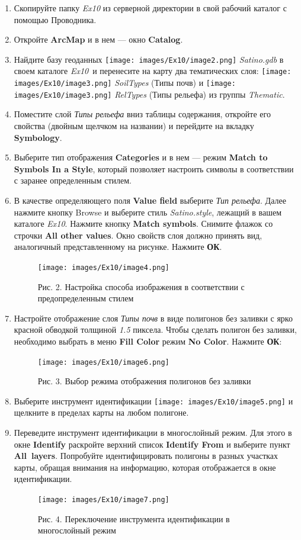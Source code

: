 \documentclass[12pt,]{book}
\begin{document}
\begin{enumerate}
\def\labelenumi{\arabic{enumi}.}
\item
  Скопируйте папку \emph{Ex10} из серверной директории в свой рабочий каталог с помощью Проводника.
\item
  Откройте \textbf{ArcMap} и в нем --- окно \textbf{Catalog}.
\item
  Найдите базу геоданных \texttt{[image: images/Ex10/image2.png]} \emph{Satino.gdb} в своем каталоге \emph{Ex10}~и перенесите на карту два тематических слоя: \texttt{[image: images/Ex10/image3.png]} \emph{SoilTypes} (Типы почв) и \texttt{[image: images/Ex10/image3.png]} \emph{RelTypes} (Типы рельефа) из группы \emph{Thematic}.
\item
  Поместите слой \emph{Типы рельефа} вниз таблицы содержания, откройте его свойства (двойным щелчком на названии) и перейдите на вкладку \textbf{Symbology}.
\item
  Выберите тип отображения \textbf{Categories} и в нем --- режим \textbf{Match to Symbols In a Style}, который позволяет настроить символы в соответствии с заранее определенным стилем.
\item
  В качестве определяющего поля \textbf{Value field} выберите \emph{Тип рельефа}. Далее нажмите кнопку Browse и выберите стиль \emph{Satino.style}, лежащий в вашем каталоге \emph{Ex10}. Нажмите кнопку \textbf{Match symbols}. Снимите флажок со строчки \textbf{All other values}. Окно свойств слоя должно принять вид, аналогичный представленному на рисунке. Нажмите \textbf{ОК}.

  \begin{figure}
  \centering
  \texttt{[image: images/Ex10/image4.png]}
  \caption{Рис. 2. Настройка способа изображения в соответствии с предопределенным стилем}
  \end{figure}
\item
  Настройте отображение слоя \emph{Типы почв} в виде полигонов без заливки с ярко красной обводкой толщиной \emph{1.5} пиксела. Чтобы сделать полигон без заливки, необходимо выбрать в меню \textbf{Fill Color} режим \textbf{No Color}. Нажмите \textbf{ОК}:

  \begin{figure}
  \centering
  \texttt{[image: images/Ex10/image6.png]}
  \caption{Рис. 3. Выбор режима отображения полигонов без заливки}
  \end{figure}
\item
  Выберите инструмент идентификации \texttt{[image: images/Ex10/image5.png]} и щелкните в пределах карты на любом полигоне.
\item
  Переведите инструмент идентификации в многослойный режим. Для этого в окне \textbf{Identify} раскройте верхний список \textbf{Identify From} и выберите пункт \textbf{All~layers}. Попробуйте идентифицировать полигоны в разных участках карты, обращая внимания на информацию, которая отображается в окне идентификации.

  \begin{figure}
  \centering
  \texttt{[image: images/Ex10/image7.png]}
  \caption{Рис. 4. Переключение инструмента идентификации в многослойный режим}
  \end{figure}
\end{enumerate}
\end{document}
